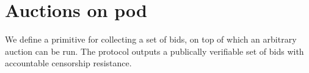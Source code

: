 \section{Auctions on pod}\label{sec:auctions}


We define a primitive for collecting a set of bids, on top of which an arbitrary auction can be run.
The protocol outputs a publically verifiable set of bids with accountable censorship resistance.


